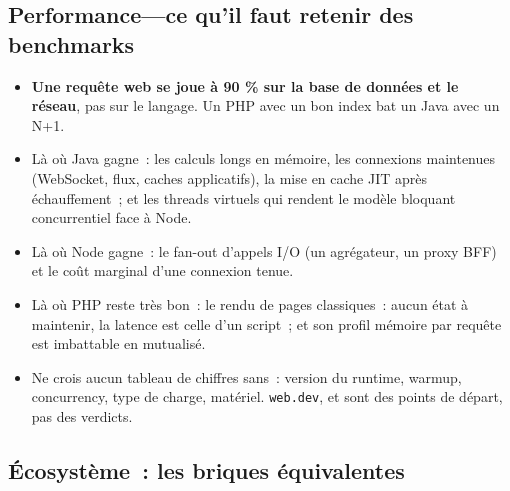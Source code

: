 \subsection{Performance---ce qu'il faut retenir des benchmarks}

\begin{itemize}
  \item \textbf{Une requ\^ete web se joue \`a 90 \% sur la base de donn\'ees et le r\'eseau}, pas sur le langage.
        Un PHP avec un bon index bat un Java avec un N+1.
  \item L\`a o\`u Java gagne~: les calculs longs en m\'emoire, les connexions maintenues (WebSocket,
        flux, caches applicatifs), la mise en cache JIT apr\`es \'echauffement~; et les threads
        virtuels qui rendent le mod\`ele bloquant concurrentiel face \`a Node.
  \item L\`a o\`u Node gagne~: le fan-out d'appels I/O (un agr\'egateur, un proxy BFF) et le co\^ut
        marginal d'une connexion tenue.
  \item L\`a o\`u PHP reste tr\`es bon~: le rendu de pages classiques~: aucun \'etat \`a maintenir, la
        latence est celle d'un script~; et son profil m\'emoire par requ\^ete est imbattable en
        mutualis\'e.
  \item Ne crois aucun tableau de chiffres sans~: version du runtime, warmup, concurrency, type de
        charge, mat\'eriel. \verb|web.dev|, 
        et  sont des points de d\'epart, pas des verdicts.
\end{itemize}

\subsection{\'Ecosyst\`eme~: les briques \'equivalentes}

